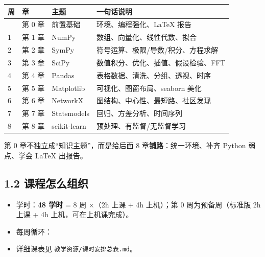 {\def\LTcaptype{none} %
\begin{longtable}[]{@{}llll@{}}
\toprule\noalign{}
周 & 章 & 主题 & 一句话说明 \\
\midrule\noalign{}
\endhead
\bottomrule\noalign{}
\endlastfoot
0 & 第 0 章 & 前置基础 & 环境、编程强化、LaTeX 报告 \\
1 & 第 1 章 & NumPy & 数组、向量化、线性代数、拟合 \\
2 & 第 2 章 & SymPy & 符号运算、极限/导数/积分、方程求解 \\
3 & 第 3 章 & SciPy & 数值积分、优化、插值、假设检验、FFT \\
4 & 第 4 章 & Pandas & 表格数据、清洗、分组、透视、时序 \\
5 & 第 5 章 & Matplotlib & 可视化、图窗布局、seaborn 美化 \\
6 & 第 6 章 & NetworkX & 图结构、中心性、最短路、社区发现 \\
7 & 第 7 章 & Statsmodels & 回归、方差分析、时间序列 \\
8 & 第 8 章 & scikit-learn & 预处理、有监督/无监督学习 \\
\end{longtable}
}

第 0 章不独立成``知识主题''，而是给后面 8
章\textbf{铺路}：统一环境、补齐 Python 弱点、学会 LaTeX 出报告。

\subsection{1.2
课程怎么组织}\label{ux8bfeux7a0bux600eux4e48ux7ec4ux7ec7}

\begin{itemize}
\tightlist
\item
  学时：\textbf{48 学时} = 8 周 ×（2h 上课 + 4h 上机）；第 0
  周为预备周（标准版 2h 上课 + 4h 上机，可在上机课完成）。
\item
  每周循环：
\end{itemize}

\begin{Shaded}
\begin{Highlighting}[]
\end{Highlighting}
\end{Shaded}

\begin{itemize}
\tightlist
\item
  详细课表见 \texttt{教学资源/课时安排总表.md}。
\end{itemize}

